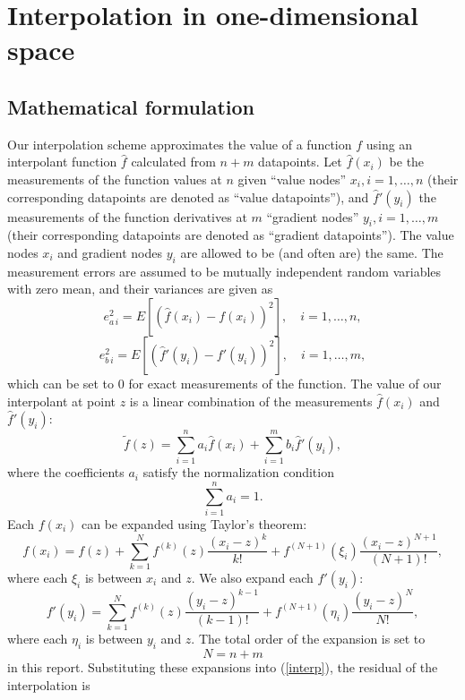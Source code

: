 \section{Interpolation in one-dimensional space}

\subsection{Mathematical formulation}
Our interpolation scheme approximates the value of a function $f$ using an
interpolant function ${\hat f}$ calculated from $n+m$ datapoints.
Let ${\hat f}(x_i)$ be the measurements of
the function values at $n$ given ``value nodes'' $x_i, i = 1, \ldots, n$
(their corresponding datapoints are denoted as ``value datapoints''), and
${\hat f}'(y_i)$ the measurements of the function derivatives at $m$
``gradient nodes'' $y_i, i = 1, \ldots, m$
(their corresponding datapoints are denoted as ``gradient datapoints'').
The value nodes $x_i$ and
gradient nodes $y_i$ are allowed to be (and often are) the same.
The measurement errors are assumed
to be mutually independent random variables with zero mean, and their variances
are given as
\[ e_{a\,i}^2 = E\left[({\hat f}(x_i) - f(x_i))^2\right],
   \quad i = 1,\ldots,n ,\]
\[ e_{b\,i}^2 = E\left[({\hat f}'(y_i) - f'(y_i))^2\right],
   \quad i = 1,\ldots,m , \]
which can be set to 0 for exact measurements of the function.
The value of our interpolant at point $z$ is a linear combination
of the measurements ${\hat f}(x_i)$ and ${\hat f}'(y_i)$:
\begin{equation} \label{interp}
  {\tilde f}(z) = \sum_{i=1}^n a_i {\hat f}(x_i)
                + \sum_{i=1}^m b_i {\hat f}'(y_i),
\end{equation}
where the coefficients $a_i$ satisfy the normalization condition
\begin{equation} \label{normalize}
  \sum_{i=1}^n a_i = 1.
\end{equation}
Each $f(x_i)$ can be expanded using Taylor's theorem:
\[ f(x_i) = f(z) + \sum_{k=1}^N f^{(k)}(z) \frac{(x_i - z)^k}{k!}
          + f^{(N+1)}(\xi_i) \frac{(x_i - z)^{N+1}}{(N+1)!}, \]
where each $\xi_i$ is between $x_i$ and $z$.
We also expand each $f'(y_i)$:
\[ f'(y_i) = \sum_{k=1}^N f^{(k)}(z) \frac{(y_i - z)^{k-1}}{(k-1)!}
           + f^{(N+1)}(\eta_i) \frac{(y_i - z)^N}{N!}, \]
where each $\eta_i$ is between $y_i$ and $z$.  The total order of the expansion
is set to \[N = n+m\] in this report.  Substituting
these expansions into (\ref{interp}), the residual of the interpolation is
